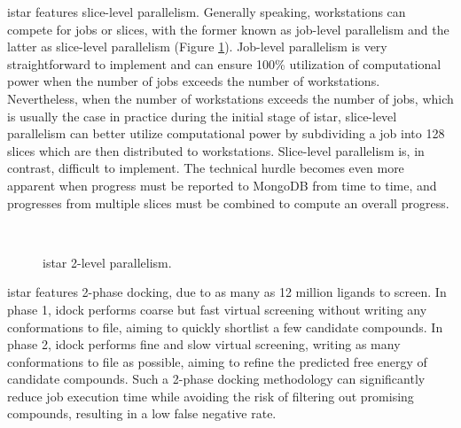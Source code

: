 istar features slice-level parallelism. Generally speaking, workstations can compete for jobs or slices, with the former known as job-level parallelism and the latter as slice-level parallelism (Figure \ref{istar:2LevelParallelism}). Job-level parallelism is very straightforward to implement and can ensure 100\% utilization of computational power when the number of jobs exceeds the number of workstations. Nevertheless, when the number of workstations exceeds the number of jobs, which is usually the case in practice during the initial stage of istar, slice-level parallelism can better utilize computational power by subdividing a job into 128 slices which are then distributed to workstations. Slice-level parallelism is, in contrast, difficult to implement. The technical hurdle becomes even more apparent when progress must be reported to MongoDB from time to time, and progresses from multiple slices must be combined to compute an overall progress.

\begin{figure}
\centering
{}
\\
\caption{istar 2-level parallelism.}
\label{istar:2LevelParallelism}
\end{figure}

istar features 2-phase docking, due to as many as 12 million ligands to screen. In phase 1, idock performs coarse but fast virtual screening without writing any conformations to file, aiming to quickly shortlist a few candidate compounds. In phase 2, idock performs fine and slow virtual screening, writing as many conformations to file as possible, aiming to refine the predicted free energy of candidate compounds. Such a 2-phase docking methodology can significantly reduce job execution time while avoiding the risk of filtering out promising compounds, resulting in a low false negative rate.

